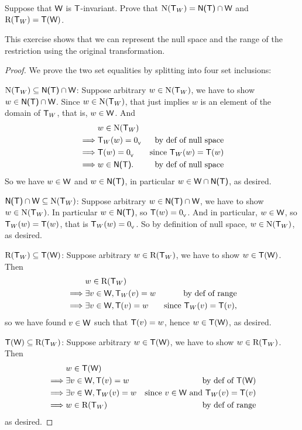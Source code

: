\begin{exercise} \label{exercise 2.1.33}
Suppose that \(\textsf{W}\) is \(\textsf{T}\)-invariant.
Prove that \(\mathrm{N}(\textsf{T}_W) = \textsf{N(T)} \cap \textsf{W}\) and \(\mathrm{R}(\textsf{T}_W) = \textsf{T}(\textsf{W})\).
\end{exercise}

\begin{note}
This exercise shows that we can represent the null space and the range of the restriction using the original transformation.
\end{note}

\begin{proof} We prove the two set equalities by splitting into four set inclusions:

\(\mathrm{N}(\textsf{T}_W) \subseteq \textsf{N(T)} \cap \textsf{W}\):
Suppose arbitrary \(w \in \mathrm{N}(\textsf{T}_W)\), we have to show \(w \in \textsf{N(T)} \cap \textsf{W}\).
Since \(w \in \mathrm{N}(\textsf{T}_W)\), that just implies \(w\) is an element of the domain of \(\textsf{T}_W\), that is, \(w \in \textsf{W}\).
And
\begin{align*}
             & w \in \mathrm{N}(\textsf{T}_W) \\
    \implies & \textsf{T}_W(w) = 0_{_{\textsf{V}}} & \text{by def of null space} \\
    \implies & \textsf{T}(w) = 0_{_{\textsf{V}}} & \text{since \(\textsf{T}_W(w) = \textsf{T}(w)\)} \\
    \implies & w \in \textsf{N(T)}. & \text{by def of null space}
\end{align*}
So we have \(w \in \textsf{W}\) and \(w \in \textsf{N(T)}\), in particular \(w \in \textsf{W} \cap \textsf{N(T)}\), as desired.

\(\textsf{N(T)} \cap \textsf{W} \subseteq \mathrm{N}(\textsf{T}_W)\):
Suppose arbitrary \(w \in \textsf{N(T)} \cap \textsf{W}\), we have to show \(w \in \mathrm{N}(\textsf{T}_W)\).
In particular \(w \in \textsf{N(T)}\), so \(\textsf{T}(w) = 0_{_{\textsf{V}}}\).
And in particular, \(w \in \textsf{W}\), so \(\textsf{T}_W(w) = \textsf{T}(w)\), that is \(\textsf{T}_W(w) = 0_{_{\textsf{V}}}\).
So by definition of null space, \(w \in \mathrm{N}(\textsf{T}_W)\), as desired.

\(\mathrm{R}(\textsf{T}_W) \subseteq \textsf{T}(\textsf{W})\):
Suppose arbitrary \(w \in \mathrm{R}(\textsf{T}_W)\), we have to show \(w \in \textsf{T}(\textsf{W})\).
Then
\begin{align*}
             & w \in \mathrm{R}(\textsf{T}_W) \\
    \implies & \exists v \in \textsf{W}, \textsf{T}_W(v) = w & \text{by def of range} \\
    \implies & \exists v \in \textsf{W}, \textsf{T}(v) = w & \text{since \(\textsf{T}_W(v) = \textsf{T}(v)\)},
\end{align*}
so we have found \(v \in \textsf{W}\) such that \(\textsf{T}(v) = w\), hence \(w \in \textsf{T}(\textsf{W})\), as desired.

\(\textsf{T}(\textsf{W}) \subseteq \mathrm{R}(\textsf{T}_W)\):
Suppose arbitrary \(w \in \textsf{T}(\textsf{W})\), we have to show \(w \in \mathrm{R}(\textsf{T}_W)\).
Then
\begin{align*}
             & w \in \textsf{T}(\textsf{W}) \\
    \implies & \exists v \in \textsf{W}, \textsf{T}(v) = w & \text{by def of \(\textsf{T}(\textsf{W})\)} \\
    \implies & \exists v \in \textsf{W}, \textsf{T}_W(v) = w & \text{since \(v \in \textsf{W}\) and \(\textsf{T}_W(v) = \textsf{T}(v)\)} \\
    \implies & w \in \mathrm{R}(\textsf{T}_W) & \text{by def of range}
\end{align*}
as desired.
\end{proof}

